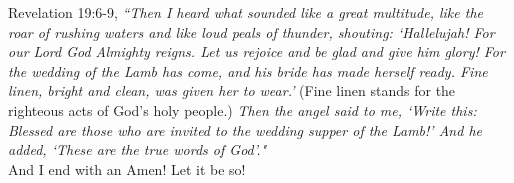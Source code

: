 \documentclass[oneside]{book}
\begin{document}
Revelation 19:6-9, \textit{``Then I heard what sounded like a great multitude, like the roar of rushing waters and like loud peals of thunder, shouting: `Hallelujah! For our Lord God Almighty reigns. Let us rejoice and be glad and give him glory! For the wedding of the Lamb has come, and his bride has made herself ready. Fine linen, bright and clean, was given her to wear.'} (Fine linen stands for the righteous acts of God's holy people.) \textit{Then the angel said to me, `Write this: Blessed are those who are invited to the wedding supper of the Lamb!' And he added, `These are the true words of God'."}\\

And I end with an Amen! Let it be so!


\backmatter
\chapter*{}
\begin{minipage}{\linewidth}
\end{minipage}\\
\clearpage
\end{document}
